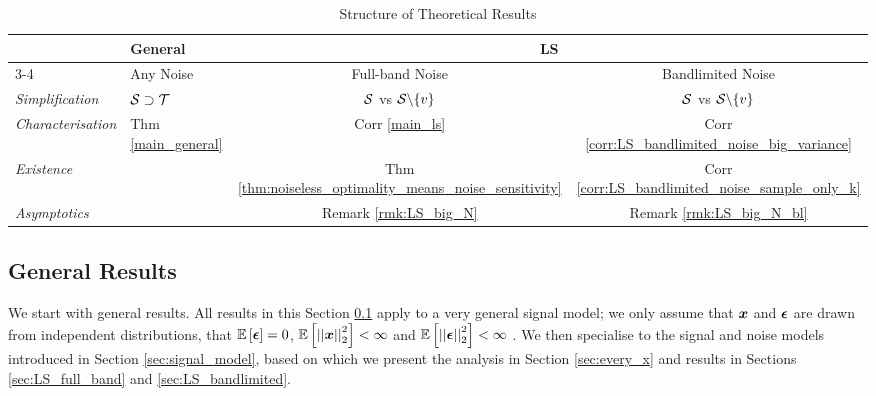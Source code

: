 \begin{table}[h]
\caption{Structure of Theoretical Results}
\centering
\begin{tabular}{@{} l >{\centering\arraybackslash}p{6em}  c c @{}}
\toprule
 & General & \multicolumn{2}{c}{LS} \\
\cmidrule(lr){3-4}
{} & Any Noise & Full-band Noise & Bandlimited Noise \\
\midrule
\emph{Simplification} & $\mathcal{S} \supset \mathcal{T}$ & {$\mathcal{S}$ vs $\mathcal{S} \backslash \{v\}$} & {$\mathcal{S}$ vs $\mathcal{S} \backslash \{v\}$} \\
\midrule
\emph{Characterisation} & Thm \ref{main_general} & Corr \ref{main_ls} & Corr \ref{corr:LS_bandlimited_noise_big_variance} \\
\midrule
\emph{Existence} & & Thm \ref{thm:noiseless_optimality_means_noise_sensitivity} & Corr \ref{corr:LS_bandlimited_noise_sample_only_k} \\
\midrule
\emph{Asymptotics} & & Remark \ref{rmk:LS_big_N} & Remark \ref{rmk:LS_big_N_bl} \\
\bottomrule
\end{tabular}
\label{tbl:general_theory_LS}
\end{table}




\subsection{General Results}
\label{sec:general}

We start with general results. All results in this Section \ref{sec:general} apply to a very general signal model; we only assume that $\bm{x}$ and $\bm{\epsilon}$ are drawn from independent distributions, that $\expect{\vect{\epsilon}} = 0$, $\expect{\sqnormvec{\vect{x}}} < \infty$ and $\expect{\sqnormvec{\vect{\epsilon}}} < \infty$ . We then specialise to the signal and noise models introduced in Section \ref{sec:signal_model}, based on which we present the analysis in Section \ref{sec:every_x} and results in Sections \ref{sec:LS_full_band} and \ref{sec:LS_bandlimited}. %

